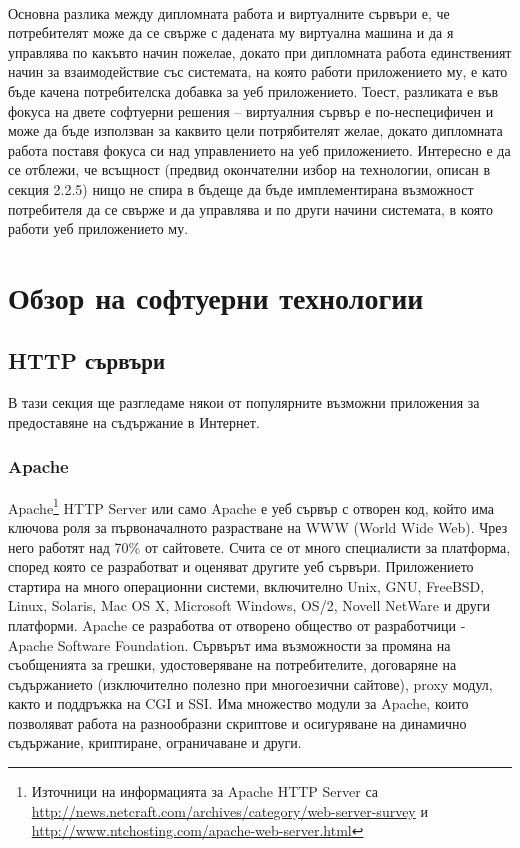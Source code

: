 \documentclass[pdftex,14pt,a4paper]{extreport}
\begin{document}
\paragraph {}
Основна разлика между дипломната работа и виртуалните сървъри е, че потребителят може да се свърже с дадената му виртуална машина и да я управлява по какъвто начин пожелае, докато при дипломната работа единственият начин за взаимодействие със системата, на която работи приложението му, е като бъде качена потребителска добавка за уеб приложението. Тоест, разликата е във фокуса на двете софтуерни решения – виртуалния сървър е по-неспецифичен и може да бъде използван за каквито цели потрябителят желае, докато дипломната работа поставя фокуса си над управлението на уеб приложението. Интересно е да се отблежи, че всъщност (предвид окончателни избор на технологии, описан в секция 2.2.5) нищо не спира в бъдеще да бъде имплементирана възможност потребителя да се свърже и да управлява и по други начини системата, в която работи уеб приложението му.
\section {Обзор на софтуерни технологии}
\subsection {HTTP сървъри}
В тази секция ще разгледаме някои от популярните възможни приложения за предоставяне на съдържание в Интернет.
\subsubsection {Apache}
Apache\footnote{Източници на информацията за Apache HTTP Server са \url{http://news.netcraft.com/archives/category/web-server-survey} и \url{http://www.ntchosting.com/apache-web-server.html}} HTTP Server или само Apache е уеб сървър с отворен код, който има ключова роля за първоначалното разрастване на WWW (World Wide Web). Чрез него работят над 70\% от сайтовете. Счита се от много специалисти за платформа, според която се разработват и оценяват другите уеб сървъри.
Приложението стартира на много операционни системи, включително Unix, GNU, FreeBSD, Linux, Solaris, Mac OS X, Microsoft Windows, OS/2, Novell NetWare и други платформи.
Apache се разработва от отворено общество от разработчици - Apache Software Foundation. Сървърът има възможности за промяна на съобщенията за грешки, удостоверяване на потребителите, договаряне на съдържанието (изключително полезно при многоезични сайтове), proxy модул, както и поддръжка на CGI и SSI. Има множество модули за Apache, които позволяват работа на разнообразни скриптове и осигуряване на динамично съдържание, криптиране, ограничаване и други.
\end{document}
